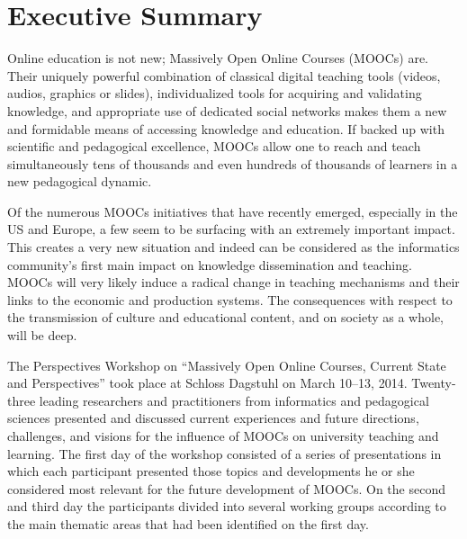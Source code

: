 
\section*{Executive Summary}





Online education is not new; Massively Open Online Courses (MOOCs)
are. Their uniquely powerful combination of classical digital teaching
tools (videos, audios, graphics or slides), individualized tools for
acquiring and validating knowledge, and appropriate use of dedicated
social networks makes them a new and formidable means of accessing
knowledge and education. If backed up with scientific and pedagogical
excellence, MOOCs allow one to reach and teach simultaneously tens of
thousands and even hundreds of thousands of learners in a new
pedagogical dynamic.


Of the numerous MOOCs initiatives that have recently emerged, especially
in the US and Europe, a few seem to be surfacing with an extremely
important impact. This creates a very new situation and indeed can be
considered as the informatics community's first main impact on knowledge
dissemination and teaching. MOOCs will very likely induce a radical
change in teaching mechanisms and their links to the economic and
production systems. The consequences with respect to the transmission of
culture and educational content, and on society as a whole, will be
deep.

The Perspectives Workshop on ``Massively Open Online Courses, Current
State and Perspectives'' took place at Schloss Dagstuhl on March 10--13,
2014. 
Twenty-three leading researchers and practitioners from
informatics and pedagogical sciences presented and discussed current
experiences and future directions, challenges, and visions for the
influence of MOOCs on university teaching and learning.
  The first day
of the workshop consisted of a series of presentations in which each
participant presented those topics and developments he or she considered
most relevant for the future development of MOOCs. On the second and
third day the participants divided into several working groups according
to the main thematic areas that had been identified on the first day.

